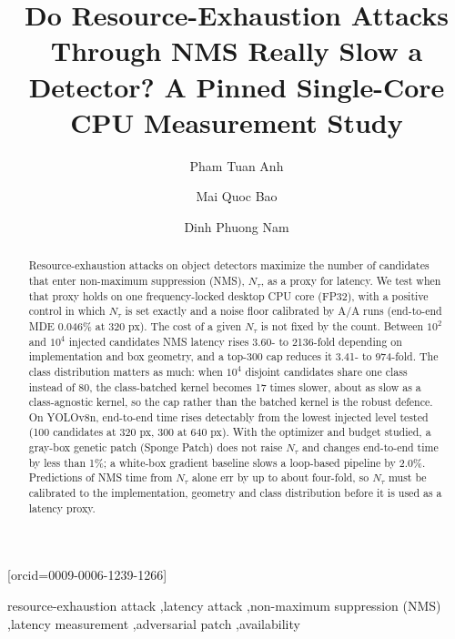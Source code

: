 \documentclass[a4paper,fleqn]{cas-dc}
\newcommand{\Ntau}{N_{\tau}}
\begin{document}
\let\WriteBookmarks\relax
\def\floatpagepagefraction{1}
\def\textpagefraction{.001}
\title[mode=title]{Do Resource-Exhaustion Attacks Through NMS Really Slow a Detector? A Pinned Single-Core CPU Measurement Study}
\author[1]{Pham Tuan Anh}
\author[1]{Mai Quoc Bao}
\author[1]{Dinh Phuong Nam}[orcid=0009-0006-1239-1266]
\cormark[1]

\begin{abstract}
Resource-exhaustion attacks on object detectors maximize the number of candidates that enter non-maximum suppression (NMS), $\Ntau$, as a proxy for latency. We test when that proxy holds on one frequency-locked desktop CPU core (FP32), with a positive control in which $\Ntau$ is set exactly and a noise floor calibrated by A/A runs (end-to-end MDE 0.046\% at 320 px). The cost of a given $\Ntau$ is not fixed by the count. Between $10^2$ and $10^4$ injected candidates NMS latency rises 3.60- to 2136-fold depending on implementation and box geometry, and a top-300 cap reduces it 3.41- to 974-fold. The class distribution matters as much: when $10^4$ disjoint candidates share one class instead of 80, the class-batched kernel becomes 17 times slower, about as slow as a class-agnostic kernel, so the cap rather than the batched kernel is the robust defence. On YOLOv8n, end-to-end time rises detectably from the lowest injected level tested (100 candidates at 320 px, 300 at 640 px). With the optimizer and budget studied, a gray-box genetic patch (Sponge Patch) does not raise $\Ntau$ and changes end-to-end time by less than 1\%; a white-box gradient baseline slows a loop-based pipeline by 2.0\%. Predictions of NMS time from $\Ntau$ alone err by up to about four-fold, so $\Ntau$ must be calibrated to the implementation, geometry and class distribution before it is used as a latency proxy.
\end{abstract}

\begin{keywords}
resource-exhaustion attack \sep latency attack \sep non-maximum suppression (NMS) \sep latency measurement \sep adversarial patch \sep availability
\end{keywords}
\end{document}
